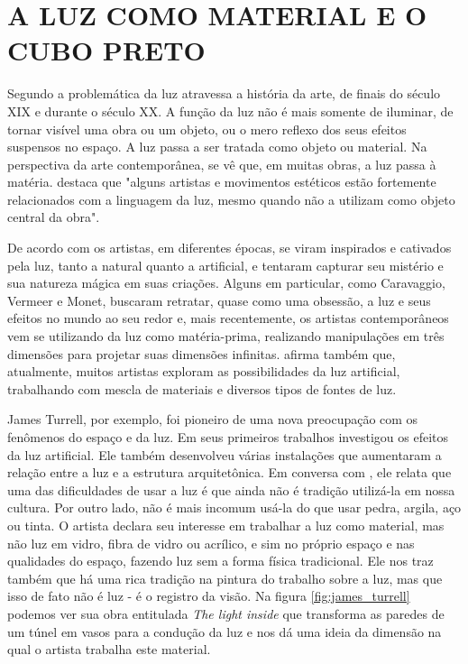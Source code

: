 \chapter{A LUZ COMO MATERIAL E O CUBO PRETO}

Segundo  a problemática da luz atravessa a história da arte, de finais do século XIX e durante o século XX. A função da luz não é mais somente de iluminar, de tornar visível uma obra ou um objeto, ou o mero reflexo dos seus efeitos suspensos no espaço. A luz passa a ser tratada como objeto ou material. Na perspectiva da arte contemporânea, se vê que, em muitas obras, a luz passa à matéria.  destaca que "alguns artistas e movimentos estéticos estão fortemente relacionados com a linguagem da luz, mesmo quando não a utilizam como objeto central da obra". 

De acordo com  os artistas, em diferentes épocas, se viram inspirados e cativados pela luz, tanto a natural quanto a artificial, e tentaram capturar seu mistério e sua natureza mágica em suas criações. Alguns em particular, como Caravaggio, Vermeer e Monet, buscaram retratar, quase como uma obsessão, a luz e seus efeitos no mundo ao seu redor e, mais recentemente, os artistas contemporâneos vem se utilizando da luz como matéria-prima, realizando manipulações em três dimensões para projetar suas dimensões infinitas.  afirma também que, atualmente, muitos artistas exploram as possibilidades da luz artificial, trabalhando com mescla de materiais e diversos tipos de fontes de luz. 

James Turrell, por exemplo, foi pioneiro de uma nova preocupação com os fenômenos do espaço e da luz. Em seus primeiros trabalhos investigou os efeitos da luz artificial. Ele também desenvolveu várias instalações que aumentaram a relação entre a luz e a estrutura arquitetônica. Em conversa com , ele relata que uma das dificuldades de usar a luz é que ainda não é tradição utilizá-la em nossa cultura. Por outro lado, não é mais incomum usá-la do que usar pedra, argila, aço ou tinta. O artista declara seu interesse em trabalhar a luz como material, mas não luz em vidro, fibra de vidro ou acrílico, e sim no próprio espaço e nas qualidades do espaço, fazendo luz sem a forma física tradicional. Ele nos traz também que há uma rica tradição na pintura do trabalho sobre a luz, mas que isso de fato não é luz - é o registro da visão. Na figura \ref{fig:james_turrell} podemos ver sua obra entitulada \textit{The light inside} que transforma as paredes de um túnel em vasos para a condução da luz e nos dá uma ideia da dimensão na qual o artista trabalha este material. 

